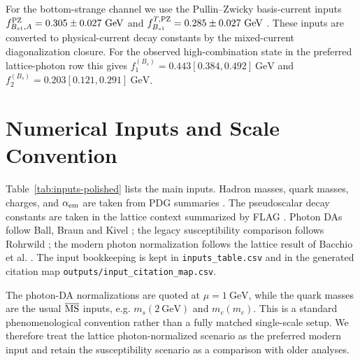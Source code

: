 \documentclass[11pt]{article}
\newcommand{\Bsone}{B_{s1}}
\newcommand{\GeV}{\mathrm{GeV}}
\begin{document}
For the bottom-strange channel we use the Pullin--Zwicky basis-current inputs
$f_{\Bsone,A}^{\rm PZ}=0.305\pm0.027~\GeV$ and
$f_{\Bsone}^{T,\rm PZ}=0.285\pm0.027~\GeV$ \cite{PullinZwicky2021}.  These
inputs are converted to physical-current decay constants by the mixed-current
diagonalization closure.  For the observed high-combination state in the
preferred lattice-photon row this gives
$f_1^{(B_s)}=0.443[0.384,0.492]~\GeV$ and
$f_2^{(B_s)}=0.203[0.121,0.291]~\GeV$.

\section{Numerical Inputs and Scale Convention}

Table~\ref{tab:inputs-polished} lists the main inputs.  Hadron masses, quark
masses, charges, and $\alpha_{\rm em}$ are taken from PDG summaries
\cite{PDG2024}.  The pseudoscalar decay constants are taken in the lattice
context summarized by FLAG \cite{FLAG2024}.  Photon DAs follow Ball, Braun and
Kivel \cite{Ball:2002ps}; the legacy susceptibility comparison follows
Rohrwild \cite{Rohrwild2007}; the modern photon normalization follows the
lattice result of Bacchio et al. \cite{Bacchio2024}.  The input bookkeeping is
kept in \texttt{inputs\_table.csv} and in the generated citation map
\texttt{outputs/input\_citation\_map.csv}.

The photon-DA normalizations are quoted at $\mu=1~\GeV$, while the quark masses
are the usual $\overline{\rm MS}$ inputs, e.g. $m_s(2~\GeV)$ and $m_c(m_c)$.
This is a standard phenomenological convention rather than a fully matched
single-scale setup.  We therefore treat the lattice photon-normalized scenario
as the preferred modern input and retain the susceptibility scenario as a
comparison with older analyses.
\end{document}
